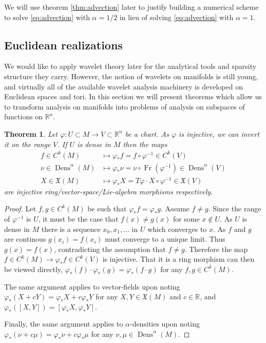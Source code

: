 \documentclass[letterpaper, 12 pt]{amsart}
\newcommand{\R}{\mathbb{R}}
\newtheorem{thm}{Theorem}[section]
\DeclareMathOperator{\Fr}{Fr}
\DeclareMathOperator{\Dens}{Dens}
\begin{document}
  We will use theorem \ref{thm:advection} later to justify building
  a numerical scheme to solve \eqref{eq:advection} with $\alpha = 1/2$
  in lieu of solving \eqref{eq:advection} with $\alpha = 1$.

\subsection{Euclidean realizations}
\label{sec:euclidean}
  We would like to apply wavelet theory later for the
  analytical tools and sparsity structure they carry.
  However, the notion of wavelets on manifolds is still young,
  and virtually all of the available wavelet analysis machinery
  is developed on Euclidean spaces and tori.
  In this section we will present theorems which allow
  us to transform analysis on manifolds into problems
  of analysis on subspaces of functions on $\R^n$.

\begin{thm}
  \label{thm:Euclidean}
  Let $\varphi:U \subset M \to V \subset \R^n$ be a chart.
  As $\varphi$ is injective, we can invert it on the range $V$.
  If $U$ is dense in $M$ then the maps
  \begin{align*}
    f \in C^k(M) &\mapsto \varphi_*f = f \circ \varphi^{-1} \in C^k(V) \\
    \nu \in \Dens^\alpha(M) &\mapsto \varphi_* \nu = \nu \circ \Fr(\varphi^{-1}) \in \Dens^\alpha(V) \\
    X \in \mathfrak{X}(M) &\mapsto \varphi_* X = T\varphi \cdot X \circ \varphi^{-1} \in \mathfrak{X}(V)
  \end{align*}
  are injective ring/vector-space/Lie-algebra morphisms respectively.
  \end{thm}
  \begin{proof}
    Let $f,g \in C^k(M)$ be such that $\varphi_* f = \varphi_*g$.
    Assume $f \neq g$.
    Since the range of $\varphi^{-1}$ is $U$, it must be the case that
    $f(x) \neq g(x)$ for some $x \notin U$.
    As $U$ is dense in $M$ there is a sequence $x_0,x_1,\dots$ in $U$
    which converges to $x$.
    As $f$ and $g$ are continous $g(x_i) = f(x_i)$ must converge to a
    unique limit.  Thus $g(x) = f(x)$, contradicting the assumption
    that $f \neq g$.
    Therefore the map $f \in C^k(M) \to \varphi_* f \in C^k(V)$
    is injective.
    That it is a ring morphism can then be viewed directly, $\varphi_*(f) \cdot \varphi_*(g) = \varphi_*(f \cdot g)$ for any $f,g \in C^k(M)$.
    
    The same argument applies to vector-fields
    upon noting $\varphi_*(X+cY) = \varphi_*X + c \varphi_*Y$ for any $X,Y \in \mathfrak{X}(M)$ and $c \in \R$, and $\varphi_*([X,Y]) = [\varphi_*X, \varphi_*Y]$.

    Finally, the same argument applies to $\alpha$-densities
    upon noting $\varphi_*( \nu + c \mu) = \varphi_*\nu + c \varphi_* \mu$ for any $\nu,\mu \in \Dens^\alpha(M)$.
  \end{proof}
  
\end{document}
